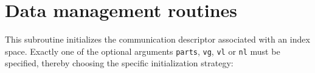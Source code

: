 \section{Data management routines}
\label{sec:toolsrout}


%
%


This subroutine initializes the communication descriptor associated
with an index space. Exactly one of the  optional arguments
\verb|parts|, \verb|vg|, \verb|vl| or \verb|nl| 
must be specified, thereby choosing
the specific initialization strategy:
